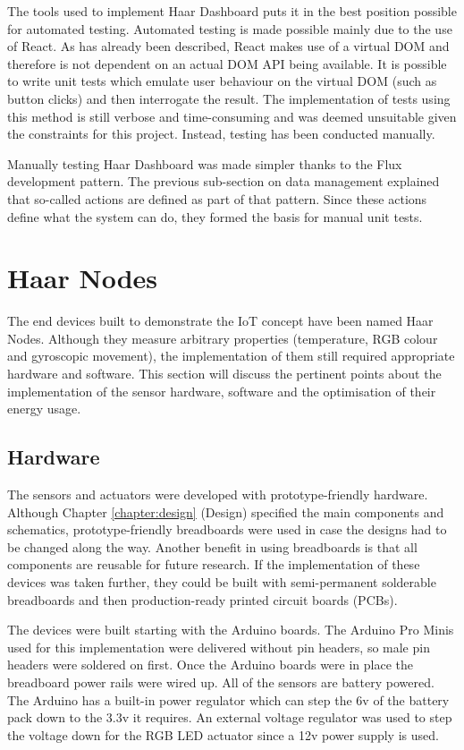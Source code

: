       The tools used to implement Haar Dashboard puts it in the best position possible for automated testing. Automated testing is made possible mainly due to the use of React. As has already been described, React makes use of a virtual DOM and therefore is not dependent on an actual DOM API being available. It is possible to write unit tests which emulate user behaviour on the virtual DOM (such as button clicks) and then interrogate the result. The implementation of tests using this method is still verbose and time-consuming and was deemed unsuitable given the constraints for this project. Instead, testing has been conducted manually.

      Manually testing Haar Dashboard was made simpler thanks to the Flux development pattern. The previous sub-section on data management explained that so-called actions are defined as part of that pattern. Since these actions define what the system can do, they formed the basis for manual unit tests.

  \section{Haar Nodes}
    The end devices built to demonstrate the IoT concept have been named Haar Nodes. Although they measure arbitrary properties (temperature, RGB colour and gyroscopic movement), the implementation of them still required appropriate hardware and software. This section will discuss the pertinent points about the implementation of the sensor hardware, software and the optimisation of their energy usage.

    \subsection{Hardware}
      The sensors and actuators were developed with prototype-friendly hardware. Although Chapter \ref{chapter:design} (Design) specified the main components and schematics, prototype-friendly breadboards were used in case the designs had to be changed along the way. Another benefit in using breadboards is that all components are reusable for future research. If the implementation of these devices was taken further, they could be built with semi-permanent solderable breadboards and then production-ready printed circuit boards (PCBs).

      The devices were built starting with the Arduino boards. The Arduino Pro Minis used for this implementation were delivered without pin headers, so male pin headers were soldered on first. Once the Arduino boards were in place the breadboard power rails were wired up. All of the sensors are battery powered. The Arduino has a built-in power regulator which can step the 6v of the battery pack down to the 3.3v it requires. An external voltage regulator was used to step the voltage down for the RGB LED actuator since a 12v power supply is used.

